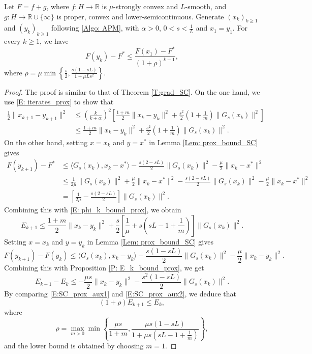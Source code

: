 \documentclass[onefignum,onetabnum]{siamart220329}
\begin{document}
\begin{theorem}
Let $F=f+g$, where $f:H\to\mathbb{R}$ is $\mu$-strongly convex and $L$-smooth, and $g:H\to\mathbb{R}\cup\{\infty\}$ is proper, convex and lower-semicontinuous. Generate $(x_k)_{k\ge 1}$ and $(y_k)_{k\ge 1}$ following \eqref{Algo: APM}, with
$\alpha>0$, $0 < s < \frac{1}{L}$ and $x_1 = y_1$. For every $k\ge 1$, we have
$$ F(y_k) - F^* \le \frac{F(x_1) - F^*}{(1+\rho)^{k-1}}, $$
where $\rho = \mu \min\left\{\frac{s}{2}, \frac{s(1-sL)}{1+\mu Ls^2} \right\}$.
\end{theorem}


\begin{proof}
The proof is similar to that of Theorem \ref{T:grad_SC}. On the one hand, we use \eqref{E: iterates_prox} to show that
\begin{align}\label{E: phi_k_bound_prox}
\frac{1}{2}\| x_{k+1} - y_{k+1} \|^2
&\le \left( \frac{k}{k+\alpha} \right)^2 \left[ \frac{1 + m}{2} \| x_k - y_k \|^2
+ \frac{s^2}{2}\left( 1 + \frac{1}{m} \right) \| G_s(x_k) \|^2 \right] \nonumber \\
&\le \frac{1 + m}{2} \| x_k - y_k \|^2
+ \frac{s^2}{2}\left( 1 + \frac{1}{m} \right) \| G_s(x_k) \|^2.
\end{align} 
On the other hand, setting $x=x_k$ and $y=x^*$ in Lemma \ref{Lem: prox_bound_SC} gives
\begin{align*} %
F(y_{k+1}) - F^* 
&\le \langle G_s(x_k), x_k - x^* \rangle - \frac{s(2-sL)}{2} \| G_s(x_k) \|^2 - \frac{\mu}{2}\| x_k - x^* \|^2 \\    
& \le \frac{1}{2\mu}\| G_s(x_k) \|^2+\frac{\mu}{2}\| x_k - x^* \|^2 - \frac{s(2-sL)}{2} \| G_s(x_k) \|^2 - \frac{\mu}{2}\| x_k - x^* \|^2 \\    
& = \left[ \frac{1}{2\mu} - \frac{s(2-sL)}{2}\right] \| G_s(x_k) \|^2.
\end{align*}
Combining this with \eqref{E: phi_k_bound_prox}, we obtain
\begin{equation} \label{E:SC_prox_aux1}
E_{k+1}\le \frac{1 + m}{2} \| x_k - y_k \|^2
+\frac{s}{2}\left[ \frac{1}{\mu} +s\left(sL - 1 +\frac{1}{m}\right) \right] \| G_s(x_k) \|^2.
\end{equation}
Setting $x=x_k$ and $y=y_k$ in Lemma \ref{Lem: prox_bound_SC} gives
$$F(y_{k+1}) - F(y_k) \le \langle G_s(x_k), x_k - y_k \rangle - \frac{s(1-sL)}{2} \| G_s(x_k) \|^2-\frac{\mu}{2}\|x_k-y_k\|^2.$$
Combining this with Proposition \ref{P: E_k_bound_prox},
we get 
\begin{equation} \label{E:SC_prox_aux2}
E_{k+1} - E_k
\le  - \frac{\mu s}{2}\|x_k-y_k\|^2   - \frac{s^2(1-sL)}{2} \| G_s(x_k) \|^2.
\end{equation}
By comparing \eqref{E:SC_prox_aux1} and \eqref{E:SC_prox_aux2}, we deduce that
$$(1+\rho)E_{k+1} \le E_k,$$
where
$$\rho=\max_{m>0}\min\left\{\frac{\mu s}{1+m}, \frac{\mu s(1-sL)}{ 1 +\mu s\left( sL - 1 + \frac{1}{m} \right) }\right\},$$
and the lower bound is obtained by choosing $m=1$.
\end{proof}
\end{document}
